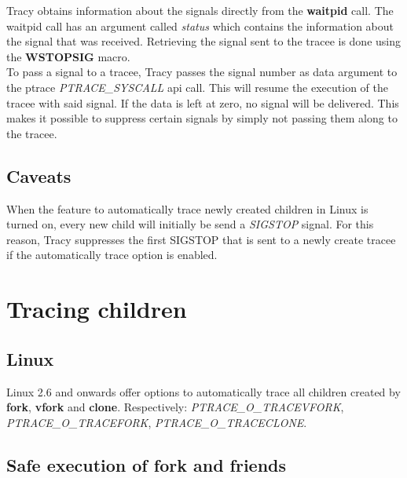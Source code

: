 \documentclass[a4paper, 10pt]{report}
\begin{document}
Tracy obtains information about the signals directly from the
\textbf{waitpid} call. The waitpid call has an argument called
\textit{status} which contains the information about the signal that was
received. Retrieving the signal sent to the tracee is done using the
\textbf{WSTOPSIG} macro. \\

To pass a signal to a tracee, Tracy passes the signal number as data
argument to the ptrace \textit{PTRACE\_SYSCALL} api call. This will
resume the execution of the tracee with said signal. If the data is
left at zero, no signal will be delivered. This makes it possible to
suppress certain signals by simply not passing them along to the tracee.


\subsection{Caveats}

When the feature to automatically trace newly created children in Linux
is turned on, every new child will initially be send a \textit{SIGSTOP}
signal. For this reason, Tracy suppresses the first SIGSTOP that is sent
to a newly create tracee if the automatically trace option is enabled.

\section{Tracing children}


\subsection{Linux}

Linux 2.6 and onwards offer options to automatically trace all children
created by \textbf{fork}, \textbf{vfork} and \textbf{clone}.
Respectively: \textit{PTRACE\_O\_TRACEVFORK}, \textit{PTRACE\_O\_TRACEFORK},
\textit{PTRACE\_O\_TRACECLONE}.


\subsection{Safe execution of fork and friends}
\label{safe-fork}
\end{document}

